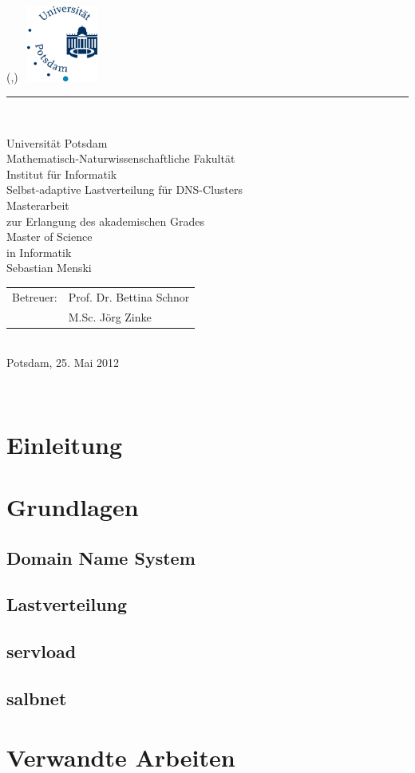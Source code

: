 \documentclass[a4paper, 11pt, toc=bibliography, toc=listof]{scrbook}
\newlength{\TitleMargin}
\newlength{\TitleWidth}
\newcommand{\TitleUni}{Universität Potsdam}
\newcommand{\TitleInstitut}{Mathematisch-Naturwissenschaftliche Fakultät\\Institut für Informatik}
\newcommand{\TitleTitel}{Selbst-adaptive Lastverteilung für DNS-Clusters}
\newcommand{\TitleTyp}{Masterarbeit}
\newcommand{\TitleAutor}{Sebastian Menski}
\newcommand{\TitleBetreuerText}{Betreuer}
\newcommand{\TitleBetreuer}{Prof. Dr. Bettina Schnor\\ &M.Sc. Jörg Zinke}
\newcommand{\TitleAbschlussText}{zur Erlangung des akademischen Grades\\Master of Science\\in Informatik}
\newcommand{\TitleOrt}{Potsdam}
\newcommand{\TitleDatum}{25. Mai 2012}
\renewcommand{\maketitle}{
  \thispagestyle{empty}
  \begin{textblock*}{\TitleWidth}(\TitleMargin,\TitleMargin)
    ~\hfill\includegraphics[height=2.5cm]{images/uni-logo}\\[3mm]
    {\color{uniblue}\rule{\TitleWidth}{1mm}}\\[5mm]
    {
      \centering
      \sffamily\Large
      {\LARGE\TitleUni}\\[0.5\baselineskip]
      {\large\TitleInstitut}\\[5\baselineskip]
      {\Huge\TitleTitel}\\[3\baselineskip]

      {\TitleTyp}\\
      \TitleAbschlussText\\[3\baselineskip]

      \TitleAutor\\[6\baselineskip]
      \begin{tabular}{rl}
        \TitleBetreuerText: & \TitleBetreuer
      \end{tabular}\\[3\baselineskip]
      \TitleOrt, \TitleDatum\par
    }
  \end{textblock*}
  ~\clearpage
}
\begin{document}
  \frontmatter
  \maketitle{}
  \tableofcontents{}

  \onehalfspacing{}
  \mainmatter
  \pagestyle{scrheadings}

  \chapter{Einleitung} %
  \label{cha:Einleitung}


  \chapter{Grundlagen} %
  \label{cha:Grundlagen}

  \section{Domain Name System} %
  \label{sec:Domain Name System}


  \section{Lastverteilung} %
  \label{sec:Lastverteilung}


  \section{servload} %
  \label{sec:servload}


  \section{salbnet} %
  \label{sec:salbnet}



  \chapter{Verwandte Arbeiten} %
  \label{cha:Verwandte Arbeiten}
\end{document}
